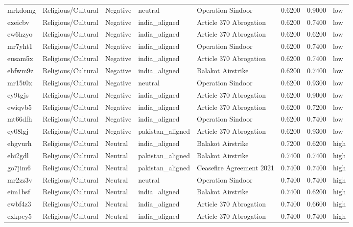 \begin{longtable}{lllllrrl}
mrkdomg & Religious/Cultural & Negative & neutral & Operation Sindoor & 0.6200 & 0.9000 & low \\
exeicbv & Religious/Cultural & Negative & india\_aligned & Article 370 Abrogation & 0.6200 & 0.7400 & low \\
ew6hzyo & Religious/Cultural & Negative & india\_aligned & Article 370 Abrogation & 0.6200 & 0.6200 & low \\
mr7yht1 & Religious/Cultural & Negative & india\_aligned & Operation Sindoor & 0.6200 & 0.7400 & low \\
eusam5x & Religious/Cultural & Negative & india\_aligned & Article 370 Abrogation & 0.6200 & 0.7400 & low \\
ehfwm9z & Religious/Cultural & Negative & india\_aligned & Balakot Airstrike & 0.6200 & 0.7400 & low \\
mr15t0x & Religious/Cultural & Negative & neutral & Operation Sindoor & 0.6200 & 0.9300 & low \\
ey9tgjs & Religious/Cultural & Negative & india\_aligned & Article 370 Abrogation & 0.6200 & 0.9000 & low \\
ewiqvb5 & Religious/Cultural & Negative & india\_aligned & Article 370 Abrogation & 0.6200 & 0.7200 & low \\
mt66dfh & Religious/Cultural & Negative & india\_aligned & Operation Sindoor & 0.6200 & 0.7400 & low \\
ey08lgj & Religious/Cultural & Negative & pakistan\_aligned & Article 370 Abrogation & 0.6200 & 0.9300 & low \\
ehgvurh & Religious/Cultural & Neutral & india\_aligned & Balakot Airstrike & 0.7200 & 0.6200 & high \\
ehi2gdl & Religious/Cultural & Neutral & pakistan\_aligned & Balakot Airstrike & 0.7400 & 0.7400 & high \\
go7jim6 & Religious/Cultural & Neutral & pakistan\_aligned & Ceasefire Agreement 2021 & 0.7400 & 0.7400 & high \\
mr2zz3v & Religious/Cultural & Neutral & neutral & Operation Sindoor & 0.7400 & 0.7400 & high \\
eim1bsf & Religious/Cultural & Neutral & india\_aligned & Balakot Airstrike & 0.7400 & 0.6200 & high \\
ewbf4z3 & Religious/Cultural & Neutral & india\_aligned & Article 370 Abrogation & 0.7400 & 0.6600 & high \\
exkpey5 & Religious/Cultural & Neutral & india\_aligned & Article 370 Abrogation & 0.7400 & 0.7400 & high \\

\end{longtable}
